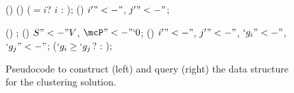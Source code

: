 \begin{figure}
	{%
		\setlength{\algomargin}{0.4em}
		\noindent\begin{minipage}[t]{.45\linewidth}
			\begin{algorithm}[H]
				\myfn(\label{ln:initialize}){\initialize{}}{
            	}
            	\BlankLine
				\myfn(\label{ln:find}){}{
					\KwRet ($=i$? $i$ : );\;
				}
				\BlankLine
				\myfn(\label{ln:merge}){}{
					$i'"<-"$,
					$j'"<-"$;\;
				}
			\end{algorithm}
		\end{minipage}
		\begin{minipage}[t]{.45\linewidth}
			\begin{algorithm}[H]
				\myfn(\label{ln:getCriticalValues}){\getCriticalValues{}}{
					\KwRet {};\;
				}
				\BlankLine
				\myfn(\label{ln:getPartition}){}{
					$S"<-"V$, $\mcP"<-"`0$;\;
				}
				\BlankLine
				\vspace{.4em}
				\myfn(\label{ln:similarity}){}{
					$i'"<-"$,
					$j'"<-"$,
					$`g_i"<-"$,
					$`g_j"<-"$;\;
					\KwRet ($`g_i\geq`g_j$?  : );\;
				}
			\end{algorithm}
		\end{minipage}
	}
	\caption{Pseudocode to construct (left) and query (right) the data structure for the clustering solution.}
	\label{fig:data_structure}
\end{figure}

